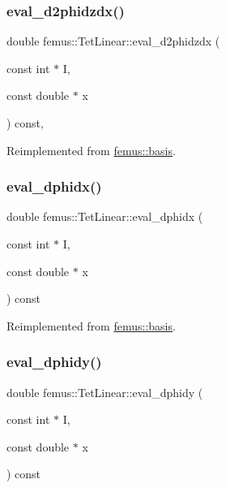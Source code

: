 \subsubsection{\texorpdfstring{eval\+\_\+d2phidzdx()}{eval\_d2phidzdx()}}
{\footnotesize\ttfamily double femus\+::\+Tet\+Linear\+::eval\+\_\+d2phidzdx (\begin{DoxyParamCaption}\item[{const int $\ast$}]{I,  }\item[{const double $\ast$}]{x }\end{DoxyParamCaption}) const\hspace{0.3cm}{\ttfamily [inline]}, {\ttfamily [virtual]}}



Reimplemented from \mbox{\hyperlink{classfemus_1_1basis_a5d619ec5bd57b7d2dc34a99d69975c77}{femus\+::basis}}.

\mbox{\label{classfemus_1_1_tet_linear_ac073a70b60d884941d44656b9fc4b226}} 
\subsubsection{\texorpdfstring{eval\+\_\+dphidx()}{eval\_dphidx()}}
{\footnotesize\ttfamily double femus\+::\+Tet\+Linear\+::eval\+\_\+dphidx (\begin{DoxyParamCaption}\item[{const int $\ast$}]{I,  }\item[{const double $\ast$}]{x }\end{DoxyParamCaption}) const\hspace{0.3cm}{\ttfamily [virtual]}}



Reimplemented from \mbox{\hyperlink{classfemus_1_1basis_a4db7d29cf8a753ddbccc4a297dafa0bf}{femus\+::basis}}.

\mbox{\label{classfemus_1_1_tet_linear_a2e636fe3c775bd207e2240588c8185c7}} 
\subsubsection{\texorpdfstring{eval\+\_\+dphidy()}{eval\_dphidy()}}
{\footnotesize\ttfamily double femus\+::\+Tet\+Linear\+::eval\+\_\+dphidy (\begin{DoxyParamCaption}\item[{const int $\ast$}]{I,  }\item[{const double $\ast$}]{x }\end{DoxyParamCaption}) const\hspace{0.3cm}{\ttfamily [virtual]}}



